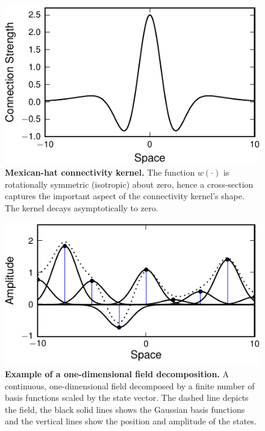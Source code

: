 \documentclass[10pt]{article}
\begin{document}
\begin{figure}[!ht]
\begin{center}
\includegraphics{./Graph/pdf/Figure1.pdf} 
\end{center}
\caption{{\bf Mexican-hat connectivity kernel.} The function $w(\cdot)$ is rotationally symmetric (isotropic) about zero, hence a cross-section captures the important aspect of the connectivity kernel's shape. The kernel decays asymptotically to zero.}
\label{fig:2d_kernel}
\end{figure}

\begin{figure}[!ht]
\begin{center}
\includegraphics{./Graph/pdf/Figure2.pdf} 
\end{center}
\caption{{\bf Example of a one-dimensional field decomposition.} A continuous, one-dimensional field decomposed by a finite number of basis functions scaled by the state vector. The dashed line depicts the field, the black solid lines shows the Gaussian basis functions and the vertical lines show the position and amplitude of the states.} 
\label{fig:FieldDecomposition}
\end{figure}
\end{document}
